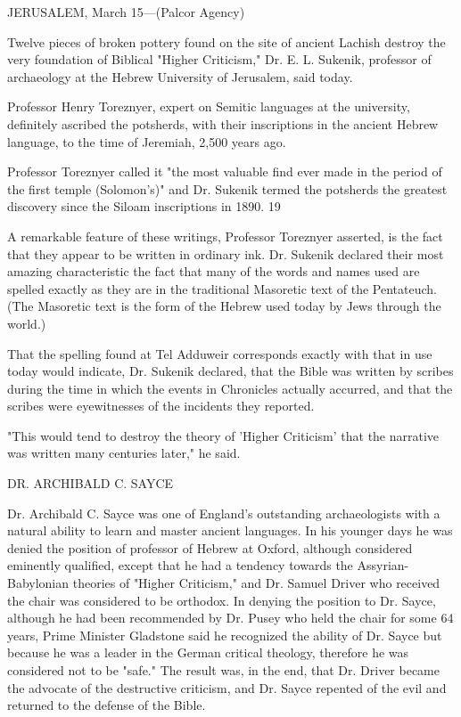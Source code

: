 JERUSALEM, March 15—(Palcor Agency)

Twelve pieces of broken pottery found on the site of ancient Lachish destroy the very
foundation of Biblical "Higher Criticism," Dr. E. L. Sukenik, professor of archaeology at the
Hebrew University of Jerusalem, said today.

Professor Henry Toreznyer, expert on Semitic languages at the university, definitely ascribed
the potsherds, with their inscriptions in the ancient Hebrew language, to the time of Jeremiah,
2,500 years ago.

Professor Toreznyer called it "the most valuable find ever made in the period of the first
temple (Solomon's)" and Dr. Sukenik termed the potsherds the greatest discovery since the
Siloam inscriptions in 1890. 19

A remarkable feature of these writings, Professor Toreznyer asserted, is the fact that they
appear to be written in ordinary ink. Dr. Sukenik declared their most amazing characteristic
the fact that many of the words and names used are spelled exactly as they are in the
traditional Masoretic text of the Pentateuch. (The Masoretic text is the form of the Hebrew
used today by Jews through the world.)

That the spelling found at Tel Adduweir corresponds exactly with that in use today would
indicate, Dr. Sukenik declared, that the Bible was written by scribes during the time in which
the events in Chronicles actually accurred, and that the scribes were eyewitnesses of the
incidents they reported.

"This would tend to destroy the theory of 'Higher Criticism' that the narrative was written
many centuries later," he said.

DR. ARCHIBALD C. SAYCE

Dr. Archibald C. Sayce was one of England's outstanding archaeologists with a natural
ability to learn and master ancient languages. In his younger days he was denied the position
of professor of Hebrew at Oxford, although considered eminently qualified, except that he
had a tendency towards the Assyrian-Babylonian theories of "Higher Criticism," and Dr.
Samuel Driver who received the chair was considered to be orthodox. In denying the position
to Dr. Sayce, although he had been recommended by Dr. Pusey who held the chair for some
64 years, Prime Minister Gladstone said he recognized the ability of Dr. Sayce but because
he was a leader in the German critical theology, therefore he was considered not to be "safe."
The result was, in the end, that Dr. Driver became the advocate of the destructive criticism,
and Dr. Sayce repented of the evil and returned to the defense of the Bible.

